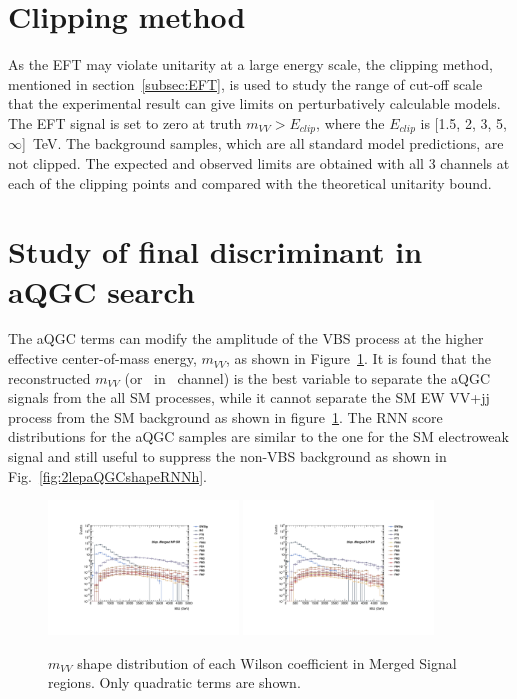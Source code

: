 \section{Clipping method}
\label{subsec:clipping}
As the EFT may violate unitarity at a large energy scale, the clipping method, mentioned in section~\ref{subsec:EFT}, is used to study the range of cut-off scale that the experimental result can give limits on perturbatively calculable models.
The EFT signal is set to zero at truth $m_{VV} > E_{clip}$, where the $E_{clip}$ is [1.5, 2, 3, 5, $\infty$]~TeV. 
The background samples, which are all standard model predictions, are not clipped.
The expected and observed limits are obtained with all 3 channels at each of the clipping points and compared with the theoretical unitarity bound.
\section{Study of final discriminant in aQGC search}
\label{subsec:2binapproach}
The aQGC terms can modify the amplitude of the VBS process at the higher effective center-of-mass energy, $m_{VV}$, as shown in Figure~\ref{fig:2lepaQGCshapeMVVh}.
It is found that the reconstructed $m_{VV}$ (or \mt\ in \zlep\ channel) is the best variable to separate the aQGC signals from the all SM processes, while it cannot separate the SM EW VV+jj process from the SM background as shown in figure~\ref{fig:2lepaQGCshapeMVVh}.
The RNN score distributions for the aQGC samples are similar to the one for the SM electroweak signal and still useful to suppress the non-VBS background as shown in Fig.~\ref{fig:2lepaQGCshapeRNNh}.
\begin{figure}[]
    \centering
   \includegraphics[width=0.45\textwidth]{figures/aQGC/MllJ_SR_HP_aQGC.pdf}
   \includegraphics[width=0.45\textwidth]{figures/aQGC/MllJ_SR_LP_aQGC.pdf}
    \caption{$m_{VV}$ shape distribution of each Wilson coefficient in Merged Signal regions. Only quadratic terms are shown.}
    \label{fig:2lepaQGCshapeMVVh}
\end{figure}

